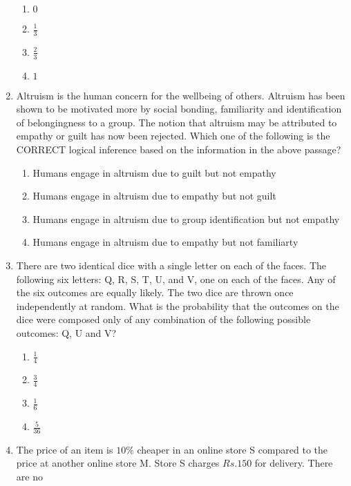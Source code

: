 \documentclass[journal]{IEEEtran}
\begin{document}
\begin{enumerate}
{\begin{figure}[H]
\label{fig:my_label}
\end{figure}
\begin{multicols}{4}
\begin{enumerate}
\item $0$
\item $\frac{1}{3}$
\item $\frac{2}{3}$
\item $1$
\end{enumerate}
\end{multicols}
}
\item{
Altruism is the human concern for the wellbeing of others. Altruism has been shown to be motivated more by social bonding, familiarity and identification of belongingness to a group. The notion that altruism may be attributed to empathy or guilt has now been rejected.
Which one of the following is the CORRECT logical inference based on the information in the above passage?
\begin{enumerate}
\item Humans engage in altruism due to guilt but not empathy
\item Humans engage in altruism due to empathy but not guilt
\item Humans engage in altruism due to group identification but not empathy
\item Humans engage in altruism due to empathy but not familiarty
\end{enumerate}
}
\item{
There are two identical dice with a single letter on each of the faces. The following six letters: Q, R, S, T, U, and V, one on each of the faces. Any of the six outcomes are equally likely.
The two dice are thrown once independently at random.
What is the probability that the outcomes on the dice were composed only of any combination of the following possible outcomes: Q, U and V?
\begin{multicols}{4}
\begin{enumerate}
\item $\frac{1}{4}$
\item $\frac{3}{4}$
\item $\frac{1}{6}$
\item $\frac{5}{36}$
\end{enumerate}
\end{multicols}
}
\item{
The price of an item is $10\%$ cheaper in an online store S compared to the price
at another online store M. Store S charges $Rs.150$ for delivery. There are no
}
\end{enumerate}
\end{document}
